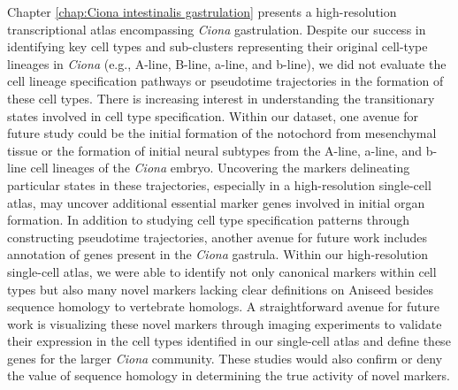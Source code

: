 \begin{dissertationepilogue}
    Chapter \ref{chap:Ciona intestinalis gastrulation} presents a high-resolution transcriptional atlas encompassing \textit{Ciona} gastrulation. Despite our success in identifying key cell types and sub-clusters representing their original cell-type lineages in \textit{Ciona} (e.g., A-line, B-line, a-line, and b-line), we did not evaluate the cell lineage specification pathways or pseudotime trajectories in the formation of these cell types. There is increasing interest in understanding the transitionary states involved in cell type specification. Within our dataset, one avenue for future study could be the initial formation of the notochord from mesenchymal tissue or the formation of initial neural subtypes from the A-line, a-line, and b-line cell lineages of the \textit{Ciona} embryo. Uncovering the markers delineating particular states in these trajectories, especially in a high-resolution single-cell atlas, may uncover additional essential marker genes involved in initial organ formation. In addition to studying cell type specification patterns through constructing pseudotime trajectories, another avenue for future work includes annotation of genes present in the \textit{Ciona} gastrula. Within our high-resolution single-cell atlas, we were able to identify not only canonical markers within cell types but also many novel markers lacking clear definitions on Aniseed besides sequence homology to vertebrate homologs. A straightforward avenue for future work is visualizing these novel markers through imaging experiments to validate their expression in the cell types identified in our single-cell atlas and define these genes for the larger \textit{Ciona} community. These studies would also confirm or deny the value of sequence homology in determining the true activity of novel markers.
    
\end{dissertationepilogue}